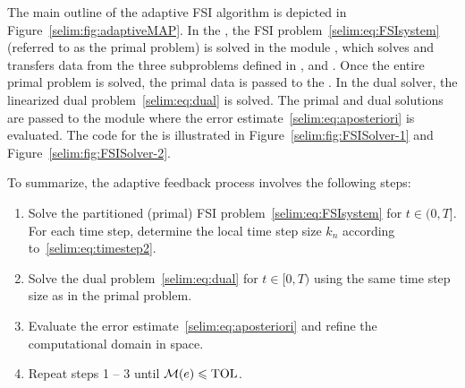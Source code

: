 The main outline of the adaptive FSI algorithm is depicted in
Figure~\ref{selim:fig:adaptiveMAP}. In the , the FSI
problem~\eqref{selim:eq:FSIsystem} (referred to as the primal problem)
is solved in the module , which solves and
transfers data from the three subproblems defined in
,  and . Once
the entire primal problem is solved, the primal data is passed to the
. In the dual solver, the linearized dual
problem~\eqref{selim:eq:dual} is solved. The primal and dual solutions
are passed to the module  where the error
estimate~\eqref{selim:eq:aposteriori} is evaluated. The code for the
 is illustrated in
Figure~\ref{selim:fig:FSISolver-1} and Figure~\ref{selim:fig:FSISolver-2}.

To summarize, the adaptive feedback process involves the following steps:
\begin{enumerate}
  \item Solve the partitioned (primal) FSI
  problem~\eqref{selim:eq:FSIsystem} for $t\in(0,T]$. For each
  time step, determine the local time step size $k_n$ according
  to~\eqref{selim:eq:timestep2}.

  \item Solve the dual problem~\eqref{selim:eq:dual} for $t\in[0,T)$
  using the same time step size as in the primal problem.

  \item Evaluate the error estimate~\eqref{selim:eq:aposteriori} and
  refine the computational domain in space.

  \item Repeat steps 1 -- 3 until $\mathcal{M}(e)\leqslant \mathrm{TOL}$.
\end{enumerate}

